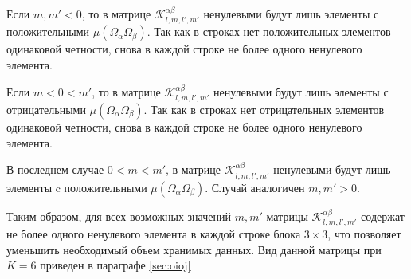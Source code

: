 Если $m, m' < 0$, то в матрице $\mathscr{K}_{l,m,l',m'}^{\alpha\beta}$ ненулевыми будут лишь элементы с положительными $\mu(\Omega_\alpha\Omega_\beta)$. Так как в строках нет положительных элементов одинаковой четности, снова в каждой строке не более одного ненулевого элемента.

Если $m < 0 < m'$, то в матрице $\mathscr{K}_{l,m,l',m'}^{\alpha\beta}$ ненулевыми будут лишь элементы с отрицательными $\mu(\Omega_\alpha\Omega_\beta)$. Так как в строках нет отрицательных элементов одинаковой четности, снова в каждой строке не более одного ненулевого элемента.

В последнем случае $0 < m < m'$, в матрице $\mathscr{K}_{l,m,l',m'}^{\alpha\beta}$ ненулевыми будут лишь элементы c положительными $\mu(\Omega_\alpha\Omega_\beta)$. Случай аналогичен $m, m' > 0$.

Таким образом, для всех возможных значений $m, m'$ матрицы $\mathscr{K}_{l,m,l',m'}^{\alpha\beta}$ содержат не более одного ненулевого элемента в каждой строке блока $3 \times 3$, что позволяет уменьшить необходимый объем хранимых данных. Вид данной матрицы при $K = 6$ приведен в параграфе \ref{sec:oioj}